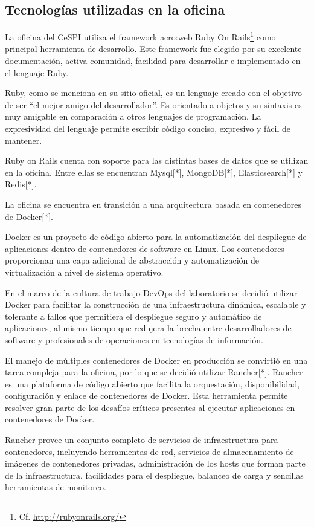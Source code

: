 \subsection{Tecnologías utilizadas en la oficina}
\label{tecnologias_utilizadas}

La oficina del CeSPI utiliza el framework \gls{acro:web} Ruby On
Rails\footnote{Cf.  \url{http://rubyonrails.org/}} como principal herramienta
de desarrollo. Este framework fue elegido por su excelente documentación,
activa comunidad, facilidad para desarrollar e implementado en el lenguaje
Ruby.

Ruby, como se menciona en su sitio oficial, es un lenguaje creado con el
objetivo de ser “el mejor amigo del desarrollador”. Es orientado a objetos y su
sintaxis es muy amigable en comparación a otros lenguajes de programación. La
expresividad del lenguaje permite escribir código conciso, expresivo y fácil de
mantener.

Ruby on Rails cuenta con soporte para las distintas bases de datos que se
utilizan en la oficina. Entre ellas se encuentran Mysql[*], MongoDB[*],
Elasticsearch[*] y Redis[*].

La oficina se encuentra en transición a una arquitectura basada en contenedores
de Docker[*].

Docker es un proyecto de código abierto para la automatización del despliegue
de aplicaciones dentro de contenedores de software en Linux. Los contenedores
proporcionan una capa adicional de abstracción y automatización de
virtualización a nivel de sistema operativo.

En el marco de la cultura de trabajo DevOps del laboratorio se decidió utilizar
Docker para facilitar la construcción de una infraestructura dinámica,
escalable y tolerante a fallos que permitiera el despliegue seguro y automático
de aplicaciones, al mismo tiempo que redujera la brecha entre desarrolladores
de software y profesionales de operaciones en tecnologías de información.

El manejo de múltiples contenedores de Docker en producción se convirtió en una
tarea compleja para la oficina, por lo que se decidió utilizar Rancher[*].
Rancher es una plataforma de código abierto que facilita la orquestación,
disponibilidad, configuración y enlace de contenedores de Docker. Esta
herramienta permite resolver gran parte de los desafíos críticos presentes al
ejecutar aplicaciones en contenedores de Docker.

Rancher provee un conjunto completo de servicios de infraestructura para
contenedores, incluyendo herramientas de red, servicios de almacenamiento de
imágenes de contenedores privadas, administración de los hosts que forman parte
de la infraestructura, facilidades para el despliegue, balanceo de carga y
sencillas herramientas de monitoreo.
